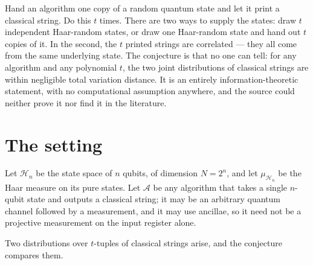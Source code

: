 \documentclass{conjura-conjecture}
\newcommand{\muH}{\mu_{\mathcal{H}_{n}}}
\newcommand{\A}{\mathcal{A}}
\begin{document}

\vspace{0.4em}

\begin{informalconjecture}
Hand an algorithm one copy of a random quantum state and let it print a
classical string. Do this $t$ times. There are two ways to supply the
states: draw $t$ independent Haar-random states, or draw one Haar-random
state and hand out $t$ copies of it. In the second, the $t$ printed
strings are correlated --- they all come from the same underlying state.
The conjecture is that no one can tell: for any algorithm and any
polynomial $t$, the two joint distributions of classical strings are
within negligible total variation distance. It is an entirely
information-theoretic statement, with no computational assumption
anywhere, and the source could neither prove it nor find it in the
literature.
\end{informalconjecture}

\section{The setting}\label{sec:setting}

Let $\mathcal{H}_{n}$ be the state space of $n$ qubits, of dimension
$N = 2^{n}$, and let $\muH$ be the Haar measure on its pure states. Let
$\A$ be any algorithm that takes a single $n$-qubit state and outputs a
classical string; it may be an arbitrary quantum channel followed by a
measurement, and it may use ancillae, so it need not be a projective
measurement on the input register alone.

Two distributions over $t$-tuples of classical strings arise, and the
conjecture compares them.
\end{document}
